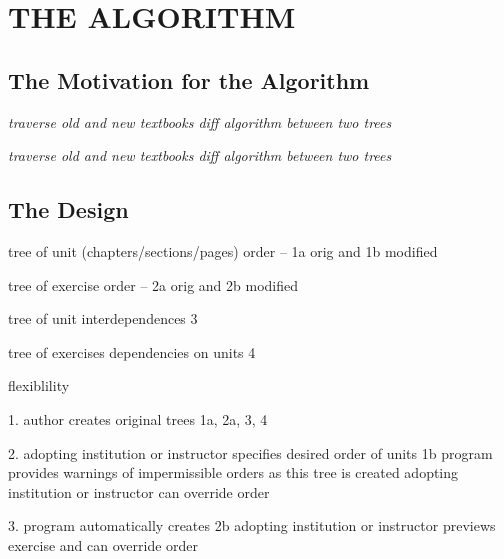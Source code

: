 %
%
%
%

\chapter{THE ALGORITHM}

\section{The Motivation for the Algorithm}

\textit{traverse old and new textbooks
diff algorithm between two trees}

\textit{traverse old and new textbooks
diff algorithm between two trees}

\cite{bile}
\cite{tsur}
\cite{reactReconcile}

\section{The Design}

tree of unit (chapters/sections/pages) order -- 1a orig and 1b modified

tree of exercise order -- 2a orig and 2b modified

tree of unit interdependences 3

tree of exercises dependencies on units 4

flexiblility 

1. author creates original trees 1a, 2a, 3, 4

2. adopting institution or instructor specifies desired order of units 1b \newline
   program provides warnings of impermissible orders as this tree is created \newline
   adopting institution or instructor can override order
   
3. program automatically creates 2b \newline
   adopting institution or instructor previews exercise and can override order
   
